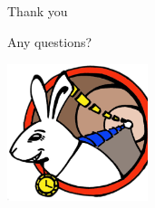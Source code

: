 \documentclass[compress,red]{beamer}
\begin{document}
\subsection{}
\begin{frame}{Thank you}

    \begin{center}
    Any questions?
    \end{center}

    
    \begin{center}
    \includegraphics[height=4.0cm]{../../figures/logo/WRlogo.ps}
    \end{center}

\end{frame}
\end{document}
